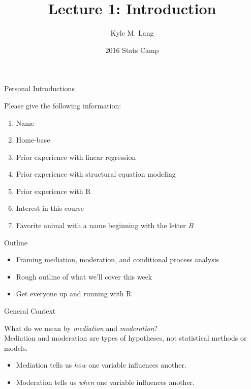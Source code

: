 \documentclass{beamer}
\title[Lecture 1]{Lecture 1: Introduction}
\author{Kyle M. Lang}
\institute[TTU IMMAP]{
  Institute for Measurement, Methodology, Analysis \& Policy\\
  Texas Tech University\\
  Lubbock, TX
}
\date{2016 Stats Camp}
\newcommand{\va}[0]{\vspace{12pt}}
\newcommand{\vb}[0]{\vspace{6pt}}
\begin{document}




\begin{frame}[plain]
  
  \titlepage
  
\end{frame}


\begin{frame}{Personal Introductions}
  
  Please give the following information:
  \vb
  \begin{enumerate}
    \item Name
      \vb
    \item Home-base
      \vb
    \item Prior experience with linear regression
      \vb
    \item Prior experience with structural equation modeling
      \vb
    \item Prior experience with \textsf{R}
      \vb
    \item Interest in this course
      \vb
    \item Favorite animal with a name beginning with the letter \emph{B}
  \end{enumerate}
  
\end{frame}


\begin{frame}{Outline}

  \begin{itemize}
  \item Framing mediation, moderation, and conditional process analysis
    \va
  \item Rough outline of what we'll cover this week
    \va
  \item Get everyone up and running with \textsf{R}
  \end{itemize}

\end{frame}


\begin{frame}{General Context}
  
  What do we mean by \emph{mediation} and \emph{moderation}?\\  
  \pause
  \va
  Mediation and moderation are types of hypotheses, not statistical
  methods or models.
  \begin{itemize}
  \item Mediation tells us \emph{how} one variable influences another.
    \vb
  \item Moderation tells us \emph{when} one variable influences another.
  \end{itemize}
    
\end{frame}
\end{document}
